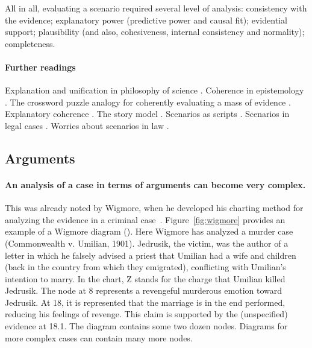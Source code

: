 \documentclass[10pt]{article}
\begin{document}
All in all, evaluating a scenario required several level of analysis: consistency with the evidence; 
explanatory power (predictive power and causal fit); evidential support; plausibility 
(and also, cohesiveness, internal consistency and normality); completeness.




\paragraph{Further readings}

Explanation and unification 
in philosophy of science \citep{friedman1974}. 
Coherence in epistemology \citep{bonjour1985}.
The crossword puzzle analogy for coherently 
evaluating a mass of evidence \citep{haack2008}.
Explanatory coherence \citep{thagard2001}.
The story model \citep{penningtonHastie1993StoryModel}. 
Scenarios as scripts \citep{wagenaarEtal1993}.
Scenarios in legal cases \citep{griffin2013}. 
Worries about scenarios in law \citep{velleman2003}.






\subsection{Arguments}


\paragraph{An analysis of a case in terms of arguments can become very complex.} This was already noted by Wigmore, when he developed his charting method for analyzing the evidence in a criminal case~\citep{wigmore1913,wigmore1931}. Figure~\ref{fig:wigmore} provides an example of a Wigmore diagram (\citeyear{wigmore1931}). Here Wigmore has analyzed a murder case (Commonwealth v. Umilian, 1901). Jedrusik, the victim, was the author of a letter in which he falsely advised a priest that Umilian had a wife and children (back in the country from which they emigrated), conflicting with Umilian’s intention to marry. In the chart, Z stands for the charge that Umilian killed Jedrusik. The node at 8 represents a revengeful murderous emotion toward Jedrusik. At 18, it is represented that the marriage is in the end performed, reducing his feelings of revenge. This claim is supported by the (unspecified) evidence at 18.1. The diagram contains some two dozen nodes. Diagrams for more complex cases can contain many more nodes.
\end{document}

